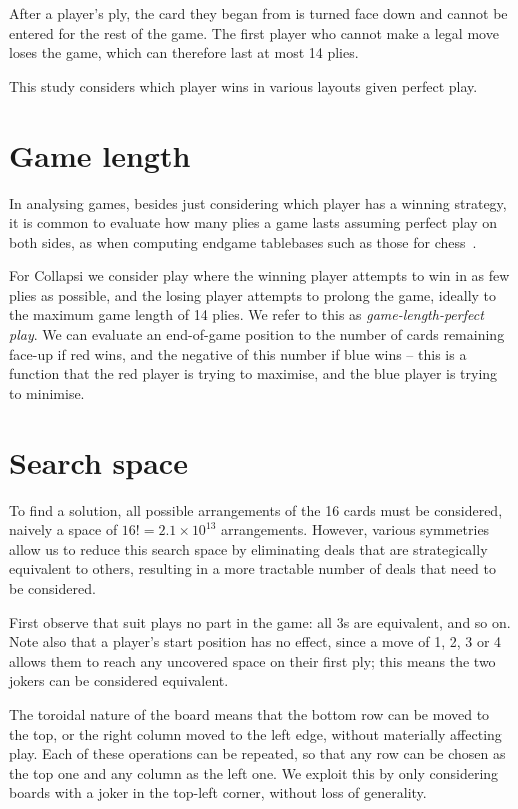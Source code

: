 \documentclass[a4paper, twocolumn]{article}
\begin{document}
After a player's ply, the card they began from is turned face down and cannot be
entered for the rest of the game. The first player who cannot make a legal move
loses the game, which can therefore last at most 14 plies.

This study considers which player wins in various layouts given perfect play.


\section{Game length}

In analysing games, besides just considering which player has a winning
strategy, it is common to evaluate how many plies a game lasts assuming perfect
play on both sides, as when computing endgame tablebases such as those for
chess~\cite{endgame}.

For Collapsi we consider play where the winning player attempts to win in as few
plies as possible, and the losing player attempts to prolong the game, ideally
to the maximum game length of 14 plies. We refer to this as
\textit{game-length-perfect play}. We can evaluate an end-of-game position to
the number of cards remaining face-up if red wins, and the negative of this
number if blue wins -- this is a function that the red player is trying to
maximise, and the blue player is trying to minimise.


\section{Search space}
\label{sec:search-space}

To find a solution, all possible arrangements of the 16 cards must be
considered, naively a space of $16! = 2.1 \times 10^{13}$ arrangements. However,
various symmetries allow us to reduce this search space by eliminating deals
that are strategically equivalent to others, resulting in a more tractable
number of deals that need to be considered.

First observe that suit plays no part in the game: all 3s are equivalent, and so
on. Note also that a player's start position has no effect, since a move of 1,
2, 3 or 4 allows them to reach any uncovered space on their first ply; this
means the two jokers can be considered equivalent.

The toroidal nature of the board means that the bottom row can be moved to the
top, or the right column moved to the left edge, without materially affecting
play. Each of these operations can be repeated, so that any row can be chosen as
the top one and any column as the left one. We exploit this by only considering
boards with a joker in the top-left corner, without loss of generality.
\end{document}

